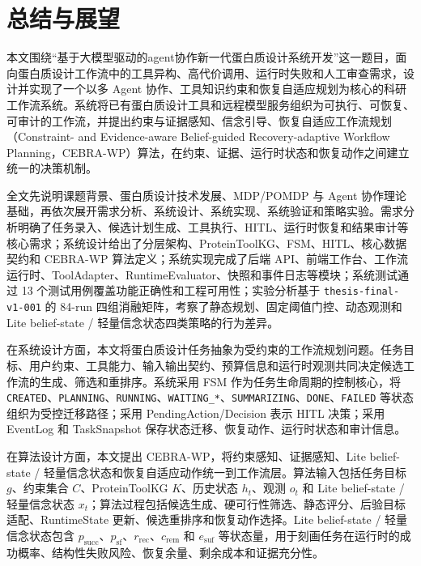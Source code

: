 \section{总结与展望}\label{ux603bux7ed3ux4e0eux5c55ux671b}

本文围绕``基于大模型驱动的agent协作新一代蛋白质设计系统开发''这一题目，面向蛋白质设计工作流中的工具异构、高代价调用、运行时失败和人工审查需求，设计并实现了一个以多
Agent
协作、工具知识约束和恢复自适应规划为核心的科研工作流系统。系统将已有蛋白质设计工具和远程模型服务组织为可执行、可恢复、可审计的工作流，并提出约束与证据感知、信念引导、恢复自适应工作流规划（Constraint-
and Evidence-aware Belief-guided Recovery-adaptive Workflow
Planning，CEBRA-WP）算法，在约束、证据、运行时状态和恢复动作之间建立统一的决策机制。

全文先说明课题背景、蛋白质设计技术发展、MDP/POMDP 与 Agent
协作理论基础，再依次展开需求分析、系统设计、系统实现、系统验证和策略实验。需求分析明确了任务录入、候选计划生成、工具执行、HITL、运行时恢复和结果审计等核心需求；系统设计给出了分层架构、ProteinToolKG、FSM、HITL、核心数据契约和
CEBRA-WP 算法定义；系统实现完成了后端
API、前端工作台、工作流运行时、ToolAdapter、RuntimeEvaluator、快照和事件日志等模块；系统测试通过
13 个测试用例覆盖功能正确性和工程可用性；实验分析基于
\texttt{thesis-final-v1-001} 的 84-run
四组消融矩阵，考察了静态规划、固定阈值门控、动态观测和 Lite belief-state
/ 轻量信念状态四类策略的行为差异。

在系统设计方面，本文将蛋白质设计任务抽象为受约束的工作流规划问题。任务目标、用户约束、工具能力、输入输出契约、预算信息和运行时观测共同决定候选工作流的生成、筛选和重排序。系统采用
FSM 作为任务生命周期的控制核心，将
\texttt{CREATED}、\texttt{PLANNING}、\texttt{RUNNING}、\texttt{WAITING\_*}、\texttt{SUMMARIZING}、\texttt{DONE}、\texttt{FAILED}
等状态组织为受控迁移路径；采用 PendingAction/Decision 表示 HITL
决策；采用 EventLog 和 TaskSnapshot
保存状态迁移、恢复动作、运行时状态和审计信息。

在算法设计方面，本文提出 CEBRA-WP，将约束感知、证据感知、Lite
belief-state /
轻量信念状态和恢复自适应动作统一到工作流层。算法输入包括任务目标
\(g\)、约束集合 \(C\)、ProteinToolKG \(K\)、历史状态 \(h_t\)、观测
\(o_t\) 和 Lite belief-state / 轻量信念状态
\(x_t\)；算法过程包括候选生成、硬可行性筛选、静态评分、后验目标适配、RuntimeState
更新、候选重排序和恢复动作选择。Lite belief-state / 轻量信念状态包含
\(p_{\mathrm{succ}}\)、\(p_{\mathrm{sf}}\)、\(r_{\mathrm{rec}}\)、\(c_{\mathrm{rem}}\)
和 \(e_{\mathrm{suf}}\)
等状态量，用于刻画任务在运行时的成功概率、结构性失败风险、恢复余量、剩余成本和证据充分性。


